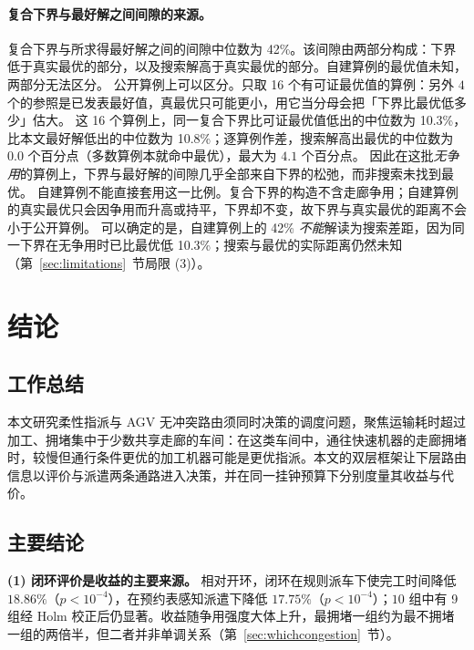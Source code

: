 \documentclass[manuscript,screen,review]{acmart}
\newcommand{\NCases}{10}
\newcommand{\GainLoopRule}{18.86\%}      %
\newcommand{\PLoopRule}{<10^{-4}}
\newcommand{\GainLoopProbe}{17.75\%}     %
\newcommand{\PLoopProbe}{<10^{-4}}
\newcommand{\CellsSigLoopAdj}{9}
\newcommand{\LBGapMed}{42\%}
\newcommand{\PubNOpt}{16}                 %
\newcommand{\PubLBSlack}{10.3\%}          %
\newcommand{\PubLBTotal}{10.8\%}          %
\newcommand{\PubLBResidMed}{0.0}          %
\newcommand{\PubLBResidMax}{4.1}          %
\begin{document}
\paragraph{复合下界与最好解之间间隙的来源。}
复合下界与所求得最好解之间的间隙中位数为 \LBGapMed{}。该间隙由两部分构成：下界低于真实最优的部分，以及搜索解高于真实最优的部分。自建算例的最优值未知，两部分无法区分。
公开算例上可以区分。只取 \PubNOpt{} 个有可证最优值的算例：另外 $4$ 个的参照是已发表最好值，真最优只可能更小，用它当分母会把「下界比最优低多少」估大。
这 \PubNOpt{} 个算例上，同一复合下界比可证最优值低出的中位数为 \PubLBSlack{}，比本文最好解低出的中位数为 \PubLBTotal{}；逐算例作差，搜索解高出最优的中位数为 $\PubLBResidMed$ 个百分点（多数算例本就命中最优），最大为 $\PubLBResidMax$ 个百分点。
因此在这批\emph{无争用}的算例上，下界与最好解的间隙几乎全部来自下界的松弛，而非搜索未找到最优。
自建算例不能直接套用这一比例。复合下界的构造不含走廊争用；自建算例的真实最优只会因争用而升高或持平，下界却不变，故下界与真实最优的距离不会小于公开算例。
可以确定的是，自建算例上的 \LBGapMed{} \emph{不能}解读为搜索差距，因为同一下界在无争用时已比最优低 \PubLBSlack{}；搜索与最优的实际距离仍然未知（第~\ref{sec:limitations}~节局限 (3)）。



\section{结论}

\subsection{工作总结}

本文研究柔性指派与 AGV 无冲突路由须同时决策的调度问题，聚焦运输耗时超过加工、拥堵集中于少数共享走廊的车间：在这类车间中，通往快速机器的走廊拥堵时，较慢但通行条件更优的加工机器可能是更优指派。本文的双层框架让下层路由信息以评价与派遣两条通路进入决策，并在同一挂钟预算下分别度量其收益与代价。


\subsection{主要结论}
\label{sec:contributions}

\textbf{(1) 闭环评价是收益的主要来源。}
相对开环，闭环在规则派车下使完工时间降低 $\GainLoopRule$（$p\PLoopRule$），在预约表感知派遣下降低 $\GainLoopProbe$（$p\PLoopProbe$）；$\NCases$ 组中有 \CellsSigLoopAdj{} 组经 Holm 校正后仍显著。收益随争用强度大体上升，最拥堵一组约为最不拥堵一组的两倍半，但二者并非单调关系（第~\ref{sec:whichcongestion}~节）。
\end{document}
